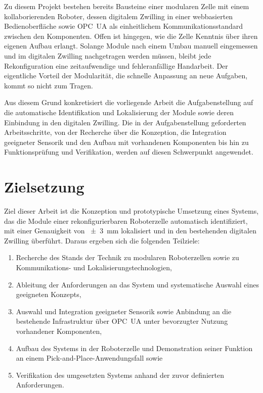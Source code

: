 Zu diesem Projekt bestehen bereits Bausteine einer modularen Zelle mit einem kollaborierenden Roboter, dessen digitalem Zwilling in einer webbasierten Bedienoberfläche sowie OPC~UA als einheitlichem Kommunikationsstandard zwischen den Komponenten. Offen ist hingegen, wie die Zelle Kenntnis über ihren eigenen Aufbau erlangt. Solange Module nach einem Umbau manuell eingemessen und im digitalen Zwilling nachgetragen werden müssen, bleibt jede Rekonfiguration eine zeitaufwendige und fehleranfällige Handarbeit. Der eigentliche Vorteil der Modularität, die schnelle Anpassung an neue Aufgaben, kommt so nicht zum Tragen.

Aus diesem Grund konkretisiert die vorliegende Arbeit die Aufgabenstellung auf die automatische Identifikation und Lokalisierung der Module sowie deren Einbindung in den digitalen Zwilling. Die in der Aufgabenstellung geforderten Arbeitsschritte, von der Recherche über die Konzeption, die Integration geeigneter Sensorik und den Aufbau mit vorhandenen Komponenten bis hin zu Funktionsprüfung und Verifikation, werden auf diesen Schwerpunkt angewendet.

\section{Zielsetzung}
\label{sec:Zielsetzung}

Ziel dieser Arbeit ist die Konzeption und prototypische Umsetzung eines Systems, das die Module einer rekonfigurierbaren Roboterzelle automatisch identifiziert, mit einer Genauigkeit von \SI{\pm 3}{\milli\metre} lokalisiert und in den bestehenden digitalen Zwilling überführt. Daraus ergeben sich die folgenden Teilziele:

\begin{enumerate}
    \item Recherche des Stands der Technik zu modularen Roboterzellen sowie zu Kommunikations- und Lokalisierungstechnologien,
    \item Ableitung der Anforderungen an das System und systematische Auswahl eines geeigneten Konzepts,
    \item Auswahl und Integration geeigneter Sensorik sowie Anbindung an die bestehende Infrastruktur über OPC~UA unter bevorzugter Nutzung vorhandener Komponenten,
    \item Aufbau des Systems in der Roboterzelle und Demonstration seiner Funktion an einem Pick-and-Place-Anwendungsfall sowie
    \item Verifikation des umgesetzten Systems anhand der zuvor definierten Anforderungen.
\end{enumerate}

